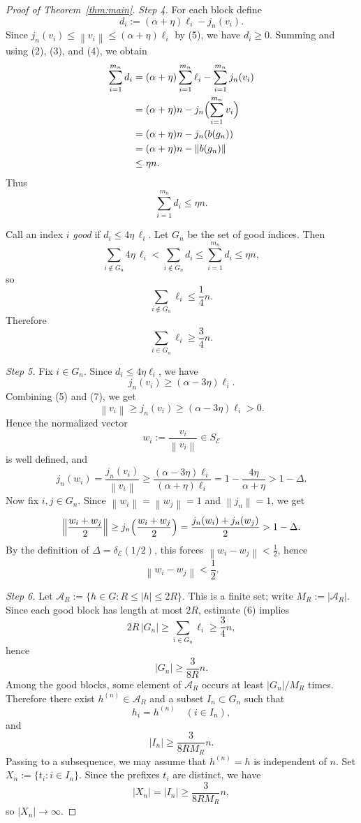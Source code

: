 \documentclass[a4paper,11pt]{amsproc}
\theoremstyle{remark}
\newcommand{\norm}[1]{\left\lVert #1\right\rVert}
\newcommand{\cE}{\mathcal E}
\begin{document}
\begin{proof}[Proof of Theorem~\ref{thm:main}]
\medskip

\noindent
\emph{Step 4.}
For each block define
\[
d_{i}:=(\alpha+\eta)\ell_{i}-j_{n}(v_{i}).
\]
Since $j_{n}(v_{i})\le \norm{v_{i}}\le (\alpha+\eta)\ell_{i}$ by (5), we have $d_{i}\ge 0$. Summing and using (2), (3), and (4), we obtain
\begin{align*}
\sum_{i=1}^{m_{n}} d_{i}
&=(\alpha+\eta)\sum_{i=1}^{m_{n}}\ell_{i}-\sum_{i=1}^{m_{n}} j_{n}(v_{i})\\
&=(\alpha+\eta)n-j_{n}\Bigl(\sum_{i=1}^{m_{n}} v_{i}\Bigr)\\
&=(\alpha+\eta)n-j_{n}(b(g_{n}))\\
&=(\alpha+\eta)n-\norm{b(g_{n})}\\
&\le \eta n.
\end{align*}
Thus
\[
\sum_{i=1}^{m_{n}} d_{i}\le \eta n.
\]

Call an index $i$ \emph{good} if
$
d_{i}\le 4\eta\,\ell_{i}.
$
Let $G_{n}$ be the set of good indices. Then
\[
\sum_{i\notin G_{n}} 4\eta\,\ell_{i}<\sum_{i\notin G_{n}} d_{i}\le \sum_{i=1}^{m_{n}} d_{i}\le \eta n,
\]
so
\[
\sum_{i\notin G_{n}} \ell_{i}\le \frac14 n.
\]
Therefore
\[
\sum_{i\in G_{n}} \ell_{i}\ge \frac34 n.
\tag{6}
\]

\medskip

\noindent
\emph{Step 5.}
Fix $i\in G_{n}$. Since $d_{i}\le 4\eta\ell_{i}$, we have
\[
j_{n}(v_{i})\ge (\alpha-3\eta)\ell_{i}.
\tag{7}
\]
Combining (5) and (7), we get
\[
\norm{v_{i}}\ge j_{n}(v_{i})\ge (\alpha-3\eta)\ell_{i}>0.
\tag{8}
\]
Hence the normalized vector
\[
w_{i}:=\frac{v_{i}}{\norm{v_{i}}}
\in S_{\cE}
\]
is well defined, and
\[
j_{n}(w_{i})=\frac{j_{n}(v_{i})}{\norm{v_{i}}}
\ge \frac{(\alpha-3\eta)\ell_{i}}{(\alpha+\eta)\ell_{i}}
=1-\frac{4\eta}{\alpha+\eta}
>1-\Delta.
\]
Now fix $i,j\in G_{n}$. Since $\norm{w_{i}}=\norm{w_{j}}=1$ and $\norm{j_{n}}=1$, we get
\[
\Bigl\lVert\frac{w_{i}+w_{j}}{2}\Bigr\rVert
\ge j_{n}\Bigl(\frac{w_{i}+w_{j}}{2}\Bigr)
=\frac{j_{n}(w_{i})+j_{n}(w_{j})}{2}
>1-\Delta.
\]
By the definition of $\Delta=\delta_{\cE}(1/2)$, this forces $\norm{w_{i}-w_{j}}<\frac12$, hence
\[
\norm{w_{i}-w_{j}}<\frac12.
\tag{9}
\]

\medskip

\noindent
\emph{Step 6.}
Let
$
\mathcal A_{R}:=\{h\in G: R\le |h|\le 2R\}.
$
This is a finite set; write $M_{R}:=|\mathcal A_{R}|$. Since each good block has length at most $2R$, estimate (6) implies
\[
2R\,|G_{n}|\ge \sum_{i\in G_{n}}\ell_{i}\ge \frac34 n,
\]
hence
\[
|G_{n}|\ge \frac{3}{8R}n.
\]
Among the good blocks, some element of $\mathcal A_{R}$ occurs at least $|G_{n}|/M_{R}$ times. Therefore there exist $h^{(n)}\in \mathcal A_{R}$ and a subset $I_{n}\subset G_{n}$ such that
\[
h_{i}=h^{(n)} \quad (i\in I_{n}),
\]
and
\[
|I_{n}|\ge \frac{3}{8RM_{R}}n.
\]
Passing to a subsequence, we may assume that $h^{(n)}=h$ is independent of $n$. Set
$
X_{n}:=\{t_{i}: i\in I_{n}\}.
$
Since the prefixes $t_{i}$ are distinct, we have
\[
|X_{n}|=|I_{n}|\ge \frac{3}{8RM_{R}}n,
\]
so $|X_{n}|\to\infty$.


\end{proof}
\end{document}
